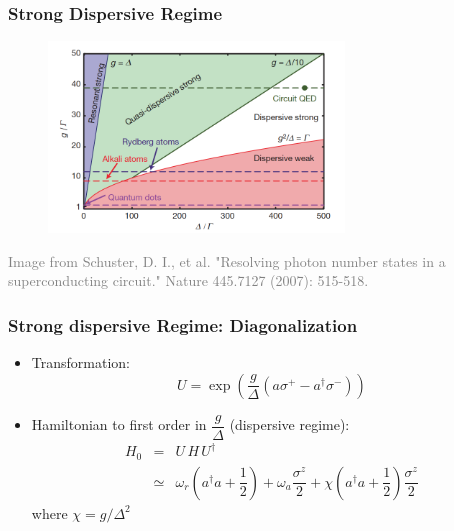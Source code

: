 \documentclass[xcolor=dvipsnames,hyperref={CJKbookmarks=true},aspectratio=169]{beamer}
\begin{document}
\begin{frame}
\frametitle{Strong Dispersive Regime}
\begin{figure}
\centering
\includegraphics[width=0.7\textwidth]{Regime}
\end{figure}

\tiny{\textcolor{gray}{Image from Schuster, D. I., et al. "Resolving photon number states in a superconducting circuit." Nature 445.7127 (2007): 515-518.\cite{schuster2007resolving}}}
\end{frame}

\begin{frame}
\frametitle{Strong dispersive Regime: Diagonalization}
\begin{itemize}
\item Transformation: 
$$U=\exp{\left(\dfrac{g}{\Delta}\left(a\sigma^{+}-a^{\dagger}\sigma^{-} \right)\right)}$$
\item Hamiltonian to first order in $\dfrac{g}{\Delta}$ (dispersive regime):
\begin{eqnarray*}
H_0 &=& U\,H\,U^{\dagger}\\
&\simeq &  \omega_r \left(a^{\dagger} a+ \dfrac{1}{2} \right) +  \omega_a \dfrac{\sigma^{z}}{2}+ \chi \left(a^{\dagger}a+\dfrac{1}{2} \right)\dfrac{\sigma^{z}}{2}
\end{eqnarray*}
where $\chi = g/\Delta ^2$
\end{itemize}
\end{frame}
\end{document}
